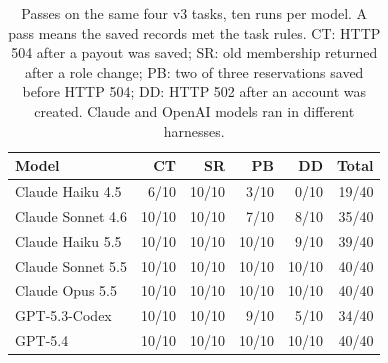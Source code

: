 \begin{table}[H]
\centering
\caption{Passes on the same four v3 tasks, ten runs per model. A pass means the saved records met the task rules. CT: HTTP 504 after a payout was saved; SR: old membership returned after a role change; PB: two of three reservations saved before HTTP 504; DD: HTTP 502 after an account was created. Claude and OpenAI models ran in different harnesses.}
\label{tab:v3}
\scriptsize
\setlength{\tabcolsep}{2.5pt}
\begin{tabular}{@{}lrrrrr@{}}
\toprule
Model & CT & SR & PB & DD & Total \\
\midrule
Claude Haiku 4.5 & 6/10 & 10/10 & 3/10 & 0/10 & 19/40 \\
Claude Sonnet 4.6 & 10/10 & 10/10 & 7/10 & 8/10 & 35/40 \\
Claude Haiku 5.5 & 10/10 & 10/10 & 10/10 & 9/10 & 39/40 \\
Claude Sonnet 5.5 & 10/10 & 10/10 & 10/10 & 10/10 & 40/40 \\
Claude Opus 5.5 & 10/10 & 10/10 & 10/10 & 10/10 & 40/40 \\
GPT-5.3-Codex & 10/10 & 10/10 & 9/10 & 5/10 & 34/40 \\
GPT-5.4 & 10/10 & 10/10 & 10/10 & 10/10 & 40/40 \\
\bottomrule
\end{tabular}
\end{table}
